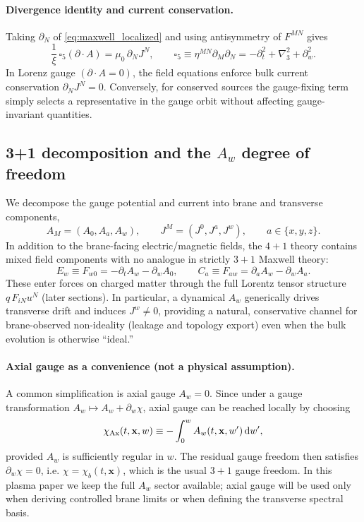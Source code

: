 \documentclass[11pt]{article}
\newcommand{\x}{\mathbf{x}}     %
\newcommand{\lapthree}{\nabla_3^2}
\newcommand{\A}{A}              %
\newcommand{\F}{F}              %
\newcommand{\J}{J}              %
\newcommand{\muzero}{\mu_0}
\begin{document}
\paragraph{Divergence identity and current conservation.}
Taking \(\partial_N\) of \eqref{eq:maxwell_localized} and using antisymmetry of
\(\F^{MN}\) gives
\begin{equation}
\frac{1}{\xi}\,\square_5(\partial\!\cdot\!\A)
=\muzero\,\partial_N\J^N,
\qquad
\square_5 \equiv \eta^{MN}\partial_M\partial_N
= -\partial_t^2+\lapthree+\partial_w^2.
\label{eq:div_identity}
\end{equation}
In Lorenz gauge \((\partial\!\cdot\!\A=0)\), the field equations enforce bulk
current conservation \(\partial_N\J^N=0\). Conversely, for conserved sources the
gauge-fixing term simply selects a representative in the gauge orbit without
affecting gauge-invariant quantities.

\subsection{3+1 decomposition and the \texorpdfstring{$A_w$}{Aw} degree of freedom}
\label{sec:Aw_scalar_photon}

We decompose the gauge potential and current into brane and transverse components,
\begin{equation}
\A_M=(A_0,A_a,A_w),
\qquad
\J^M=(J^0,J^a,J^w),
\qquad a\in\{x,y,z\}.
\end{equation}
In addition to the brane-facing electric/magnetic fields, the \(4+1\) theory
contains mixed field components with no analogue in strictly \(3+1\) Maxwell
theory:
\begin{equation}
E_w \equiv \F_{w0} = -\partial_t A_w - \partial_w A_0,
\qquad
C_a \equiv \F_{aw} = \partial_a A_w - \partial_w A_a.
\label{eq:mixed_fields_em}
\end{equation}
These enter forces on charged matter through the full Lorentz tensor structure
\(q\,\F_{iN}u^N\) (later sections). In particular, a dynamical \(A_w\) generically
drives transverse drift and induces \(J^w\neq 0\), providing a natural,
conservative channel for brane-observed non-ideality (leakage and topology export)
even when the bulk evolution is otherwise ``ideal.''

\paragraph{Axial gauge as a convenience (not a physical assumption).}
A common simplification is axial gauge \(A_w=0\). Since under a gauge
transformation \(\A_w\mapsto \A_w+\partial_w\chi\), axial gauge can be reached
locally by choosing
\begin{equation}
\chi_{\rm Ax}(t,\x,w)\equiv -\int_{0}^{w}A_w(t,\x,w')\,\dd w',
\end{equation}
provided \(A_w\) is sufficiently regular in \(w\). The residual gauge freedom then
satisfies \(\partial_w\chi=0\), i.e. \(\chi=\chi_b(t,\x)\), which is the usual
\(3+1\) gauge freedom. In this plasma paper we keep the full \(A_w\) sector
available; axial gauge will be used only when deriving controlled brane limits or
when defining the transverse spectral basis.
\end{document}
